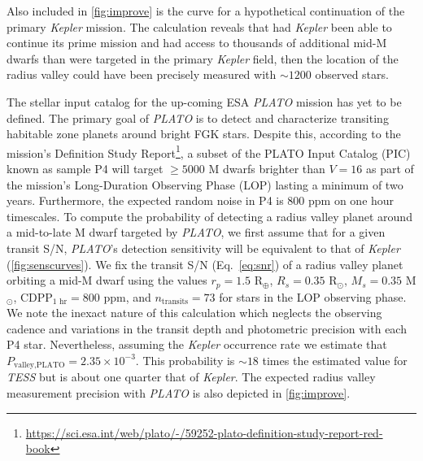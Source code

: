 \documentclass[twocolumn]{emulateapj}
\newcommand{\kepler}[1]{\emph{Kepler}#1}
\newcommand{\tess}[1]{\emph{TESS}#1}
\newcommand{\plato}[1]{\emph{PLATO}#1}
\begin{document}
Also included in \autoref{fig:improve} is the curve for a hypothetical continuation of the primary \kepler{} mission.
The calculation reveals that had \kepler{} been able to continue its prime mission and had
access to thousands of additional mid-M dwarfs than were targeted in the primary \kepler{} field, then the location
of the radius valley could have been precisely measured with $\sim 1200$ observed stars.

The stellar input catalog for the up-coming ESA \plato{} mission \citep{rauer14} has yet to be defined. The primary goal
of \plato{} is to detect and characterize transiting habitable zone planets around bright FGK stars. Despite this,
according to the mission's Definition Study
Report\footnote{\url{https://sci.esa.int/web/plato/-/59252-plato-definition-study-report-red-book}}, a subset of 
the PLATO Input Catalog (PIC) known as sample P4 will target $\geq 5000$ M dwarfs brighter than $V=16$ as part of
the mission's Long-Duration Observing Phase (LOP) lasting a minimum of two years. Furthermore, the expected random
noise in P4 is 800 ppm on one hour timescales. To compute the probability of
detecting a radius valley planet around a mid-to-late M dwarf targeted by \plato{,} we first assume that for a given
transit S/N, \plato{'s} detection sensitivity will be equivalent to that of \kepler{} (\autoref{fig:senscurves}).
We fix the transit S/N
(Eq.~\ref{eq:snr}) of a radius valley planet orbiting a mid-M dwarf using the values $r_p=1.5$ R$_{\oplus}$, $R_s=0.35$
R$_{\odot}$, $M_s=0.35$ M$_{\odot}$, CDPP$_{1\text{ hr}}=800$ ppm, and $n_{\text{transits}}=73$ for stars in the LOP observing
phase. We note the inexact nature of this calculation which
neglects the observing cadence and variations in the transit depth and photometric precision with each P4 star.
Nevertheless, assuming the \kepler{} occurrence rate we estimate that $P_{\text{valley,PLATO}}=2.35 \times 10^{-3}$. This
probability is $\sim 18$ times the estimated value for \tess{} but is about one quarter that of \kepler{.} The expected
radius valley measurement precision with \plato{} is also depicted in \autoref{fig:improve}. 
\end{document}
